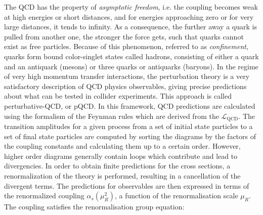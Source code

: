 The QCD has the property of \textit{asymptotic freedom}, i.e. the coupling becomes weak at high energies or short distances, and for energies approaching zero or for very large distances, it tends to infinity.
As a consequence, the further away a quark is pulled from another one, the stronger the force gets, such that quarks cannot exist as free particles.
Because of this phenomenon, referred to as \textit{confinement}, quarks form bound color-singlet states called hadrons, consisting of either a quark and an antiquark (mesons) or three quarks or antiquarks (baryons).
In the regime of very high momentum transfer interactions, the perturbation theory is a very satisfactory description of QCD physics observables, giving precise predictions about what can be tested in collider experiments. This approach is called perturbative-QCD, or pQCD. In this framework, QCD predictions are calculated using the formalism of the Feynman rules which are derived from the $\mathcal{L}_\mathrm{QCD}$.
The transition amplitudes for a given process from a set of initial state particles to a set of final state particles are computed by sorting the diagrams by the factors of the coupling constants and calculating them up to a certain order.
However, higher order diagrams generally contain loops which contribute and lead to divergencies.
In order to obtain finite predictions for the cross sections, a renormalization of the theory is performed, resulting in a cancellation of the divergent terms.
The predictions for observables are then expressed in terms of the renormalized coupling $\alpha_s(\mu^2_R)$, a function of the renormalisation scale $\mu_R$. 
The coupling satisfies the renormalisation group equation:

